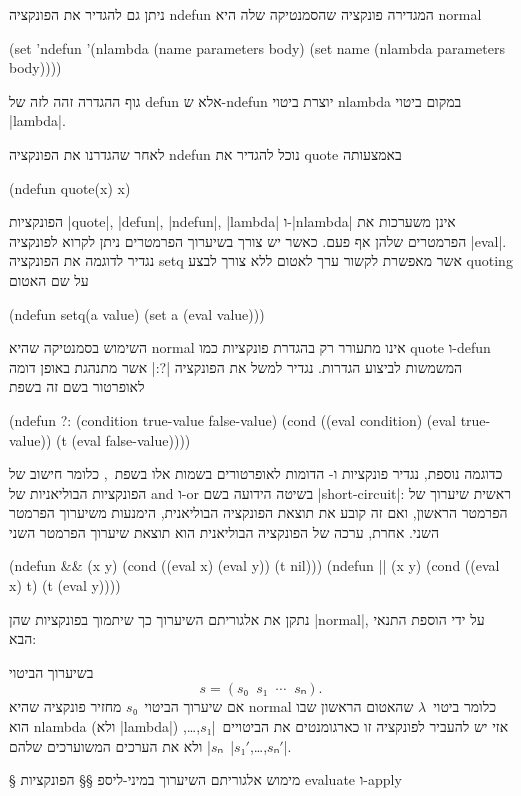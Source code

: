 ניתן גם להגדיר את הפונקציה ndefun המגדירה פונקציה שהסמנטיקה שלה היא normal
\begin{LIBRARY}
(set 'ndefun '(nlambda (name parameters body)
    (set name (nlambda parameters body))))
\end{LIBRARY}
גוף ההגדרה זהה לזה של defun אלא ש-ndefun יוצרת ביטוי nlambda במקום ביטוי
\E|lambda|.

לאחר שהגדרנו את הפונקציה ndefun נוכל להגדיר את quote באמצעותה
\begin{LISP}
(ndefun quote(x) x)
\end{LISP}
הפונקציות \E|quote|, \E|defun|, \E|ndefun|, \E|lambda| ו-\E|nlambda| אינן
משערכות את הפרמטרים שלהן אף פעם. כאשר יש צורך בשיערוך הפרמטרים ניתן לקרוא
לפונקציה \E|eval|. נגדיר לדוגמה את הפונקציה setq אשר מאפשרת לקשור ערך לאטום ללא
צורך לבצע quoting על שם האטום
\begin{LISP}
(ndefun setq(a value)
  (set a (eval value)))
\end{LISP}
השימוש בסמנטיקה שהיא normal אינו מתעורר רק בהגדרת פונקציות כמו quote ו-defun
המשמשות לביצוע הגדרות. נגדיר למשל את הפונקציה \T|?:| אשר מתנהגת באופן דומה
לאופרטור בשם זה בשפת~\CPL
\begin{LISP}
(ndefun ?: (condition true-value false-value)
  (cond ((eval condition) (eval true-value))
        (t (eval false-value))))
\end{LISP}
כדוגמה נוספת, נגדיר פונקציות \lisp{||} ו-\lisp{&&} הדומות לאופרטורים בשמות אלו
בשפת~\CPL, כלומר חישוב של הפונקציות הבוליאניות של and ו-or בשיטה הידועה בשם
\E|short-circuit|: ראשית שיערוך של הפרמטר הראשון, ואם זה קובע את תוצאת הפונקציה
הבוליאנית, הימנעות משיערוך הפרמטר השני. אחרת, ערכה של הפונקציה הבוליאנית הוא תוצאת
שיערוך הפרמטר השני
\begin{LISP}
(ndefun && (x y)
  (cond ((eval x) (eval y))
        (t nil)))
(ndefun || (x y)
  (cond ((eval x) t)
        (t (eval y))))
\end{LISP}

נתקן את אלגוריתם השיערוך כך שיתמוך בפונקציות שהן \E|normal|, על ידי הוספת התנאי
הבא:
\begin{mdframed}[backgroundcolor=Lavender!20]
  \footnotesize
  בשיערוך הביטוי \[
    s=(s₀\;\;s₁\;\;⋯\;\;sₙ).
\] אם שיערוך הביטוי~$s₀$ מחזיר פונקציה שהיא
  normal כלומר ביטוי~$λ$ שהאטום הראשון שבו הוא nlambda (ולא \E|lambda|) אזי יש
  להעביר לפונקציה זו כארגומנטים את הביטויים~\E|$s₁$,…,$sₙ$| ולא את הערכים
  המשוערכים שלהם~\E|$s₁'$,…,$sₙ'$|.
\end{mdframed}

§ מימוש אלגוריתם השיערוך במיני-ליספ
§§ הפונקציות evaluate ו-apply

